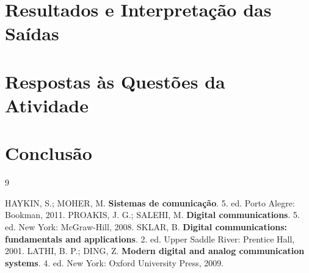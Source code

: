 \documentclass[12pt,a4paper]{article}
\begin{document}
\section{Resultados e Interpretação das Saídas}\label{sec:res}



\section{Respostas às Questões da Atividade}\label{sec:quest}



\section{Conclusão}\label{sec:concl}



\begin{thebibliography}{9}
\renewcommand{\refname}{REFERÊNCIAS}
 HAYKIN, S.; MOHER, M. \textbf{Sistemas de comunicação}. 5. ed. Porto Alegre: Bookman, 2011.
 PROAKIS, J. G.; SALEHI, M. \textbf{Digital communications}. 5. ed. New York: McGraw-Hill, 2008.
 SKLAR, B. \textbf{Digital communications: fundamentals and applications}. 2. ed. Upper Saddle River: Prentice Hall, 2001.
 LATHI, B. P.; DING, Z. \textbf{Modern digital and analog communication systems}. 4. ed. New York: Oxford University Press, 2009.
\end{thebibliography}


\end{document}
